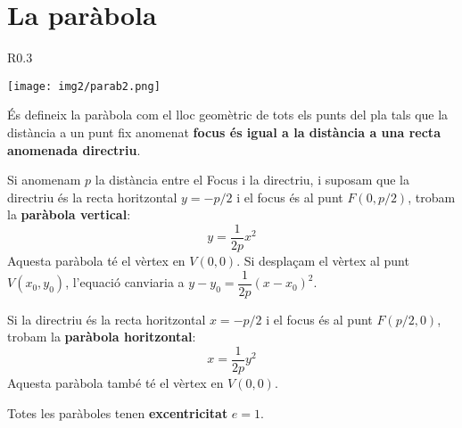 \documentclass[11pt, a4paper, pdf]{article}
\begin{document}
\section{La paràbola}

\begin{theorybox}
	\begin{wrapfigure}{R}{0.3\textwidth} 
		\vspace{-0.5cm}
		\begin{center}
			\texttt{[image: img2/parab2.png]}
			\vspace{-1cm}
		\end{center}
	\end{wrapfigure}
	És defineix la paràbola com el lloc geomètric de tots els punts del pla
	tals que la distància a un punt fix anomenat \textbf{focus és igual a la distància a una recta anomenada directriu}.
	
	Si anomenam $p$ la distància entre el Focus i la directriu, i suposam que la directriu és la recta horitzontal $y=-p/2$ i el focus és al punt $F(0, p/2)$, trobam la \textbf{paràbola vertical}:
	\begin{equation}
	\label{eq:parabola-v}
	y=\frac{1}{2p}x^2
	\end{equation} 
	Aquesta paràbola té el vèrtex en $V(0,0)$. Si desplaçam el vèrtex al punt $V(x_0,y_0)$, l'equació canviaria a $y-y_0=\dfrac{1}{2p}(x-x_0)^2$.
	
	Si la directriu és la recta horitzontal $x=-p/2$ i el focus és al punt $F(p/2, 0)$, trobam la \textbf{paràbola horitzontal}:
	\begin{equation}
	\label{eq:parabola-h}
	x = \frac{1}{2p}y^2
	\end{equation} 
	Aquesta paràbola també té el vèrtex en $V(0,0)$.
	
	Totes les paràboles tenen \textbf{excentricitat} $e=1$.
	
\end{theorybox}
\end{document}
